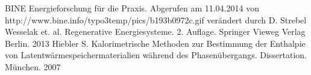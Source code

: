 \documentclass[11pt,a4paper]{scrartcl}
\begin{document}
\listoftables
\newpage
\listoffigures
\newpage
\begin{thebibliography}{99}
	BINE Energieforschung für die Praxis. Abgerufen am 11.04.2014 von
	http://www.bine.info/typo3temp/pics/b193b0972c.gif verändert durch D. Strebel
	Wesselak et. al. Regenerative Energiesysteme. 2. Auflage.
	Springer Vieweg Verlag Berlin. 2013
	 Hiebler S. Kalorimetrische Methoden zur Bestimmung der
	Enthalpie von Latentwärmespeichermaterialien während des Phasenübergangs. Dissertation.
	München. 2007
\end{thebibliography}
\end{document}
